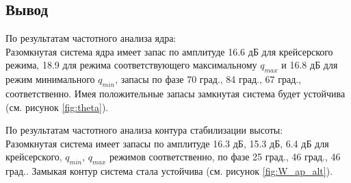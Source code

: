 \subsection{Вывод}
По результатам частотного анализа ядра:\\
Разомкнутая система ядра имеет запас по амплитуде 16.6 дБ для крейсерского
режима, 18.9 для режима соответствующего максимальному $q_{max}$ и 16.8 дБ для
режим минимального $q_{min}$, запасы по фазе 70 град., 84 град., 67 
град., соответственно. Имея положительные запасы замкнутая система будет
устойчива (см. рисунок \ref{fig:theta}).

По результатам частотного анализа контура стабилизации высоты:\\
Разомкнутая система имеет запасы по амплитуде 16.3 дБ, 15.3 дБ, 6.4 дБ для
крейсерского, $q_{min}$, $q_{max}$ режимов соответственно, по фазе 25 град., 46 
град., 46 град.. Замыкая контур система стала устойчива
(см. рисунок \ref{fig:W_ap_alt}).   

